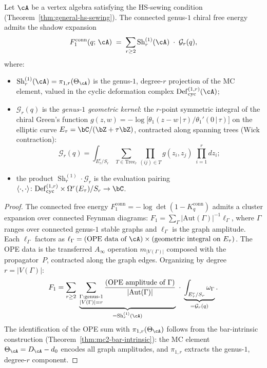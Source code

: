 \begin{theorem}
\label{thm:sewing-shadow-intertwining}
\ClaimStatusConditional
Let $\cA$ be a vertex algebra satisfying the HS-sewing condition
\textup{(}Theorem~\textup{\ref{thm:general-hs-sewing}}\textup{)}.
The connected genus-$1$ chiral free energy admits the shadow
expansion
\begin{equation}\label{eq:sewing-shadow-intertwining}
 F_1^{\mathrm{conn}}(q;\,\cA)
 \;=\;
 \sum_{r\ge2}
 \operatorname{Sh}_r^{(1)}(\cA)\;\cdot\;
 \mathcal{G}_r(q),
\end{equation}
where:
\begin{itemize}[nosep]
\item $\operatorname{Sh}_r^{(1)}(\cA)
 = \pi_{1,r}(\Theta_\cA)$ is the genus-$1$, degree-$r$ projection
 of the MC element, valued in the cyclic deformation complex
 $\mathrm{Def}_{\mathrm{cyc}}^{(1,r)}(\cA)$;
\item $\mathcal{G}_r(q)$ is the \emph{genus-$1$ geometric kernel}:
 the $r$-point symmetric integral of the chiral Green's
 function $g(z,w) = -\log\bigl[\theta_1(z{-}w\,|\,\tau)
 /\theta_1'(0\,|\,\tau)\bigr]$ on the elliptic curve
 $E_\tau = \bC/(\bZ+\tau\bZ)$, contracted along spanning trees
 \textup{(}Wick contraction\textup{)}:
 \[
 \mathcal{G}_r(q)
 = \int_{E_\tau^r/S_r}
 \sum_{T \in \mathrm{Tree}_r}
 \prod_{(ij)\in T} g(z_i,z_j)\;
 \prod_{i=1}^r dz_i;
 \]
\item the product $\operatorname{Sh}_r^{(1)} \cdot \mathcal{G}_r$ is
 the evaluation pairing
 $\langle\cdot,\cdot\rangle \colon
 \mathrm{Def}_{\mathrm{cyc}}^{(1,r)} \times
 \Omega^r(E_\tau)/S_r \to \bC$.
\end{itemize}
\end{theorem}

\begin{proof}
The connected free energy $F_1^{\mathrm{conn}}
= -\log\det(1 - K_q^{\mathrm{conn}})$
admits a cluster expansion over connected Feynman diagrams:
$F_1 = \sum_\Gamma \lvert\mathrm{Aut}(\Gamma)\rvert^{-1}
\ell_\Gamma$, where $\Gamma$ ranges over connected genus-$1$
stable graphs and $\ell_\Gamma$ is the graph amplitude.
Each $\ell_\Gamma$ factors as
$\ell_\Gamma = (\text{OPE data of }\cA)
\times (\text{geometric integral on }E_\tau)$.
The OPE data is the transferred $A_\infty$ operation
$m_{|V(\Gamma)|}$ composed with the propagator~$P$, contracted
along the graph edges. Organizing by degree
$r = |V(\Gamma)|$:
\[
 F_1
 = \sum_{r\ge2}\;
 \underbrace{\sum_{\substack{\Gamma : \text{genus-}1 \\
 |V(\Gamma)|=r}}
 \frac{(\text{OPE amplitude of }\Gamma)}
 {\lvert\mathrm{Aut}(\Gamma)\rvert}}_{
 = \operatorname{Sh}_r^{(1)}(\cA)}
 \;\cdot\;
 \underbrace{\int_{E_\tau^r/S_r}
 \omega_\Gamma}_{= \mathcal{G}_r(q)}.
\]
The identification of the OPE sum with
$\pi_{1,r}(\Theta_\cA)$ follows from
the bar-intrinsic construction
(Theorem~\ref{thm:mc2-bar-intrinsic}): the MC element
$\Theta_\cA = D_\cA - d_0$ encodes all graph amplitudes,
and $\pi_{1,r}$ extracts the genus-$1$, degree-$r$ component.
\end{proof}


